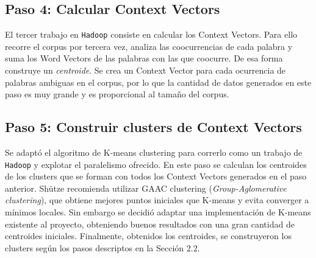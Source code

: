 \documentclass[11pt]{article}
\begin{document}
\subsection{Paso 4: Calcular Context Vectors}
El tercer trabajo en \texttt{Hadoop} consiste en calcular los Context Vectors. Para ello recorre el corpus por tercera vez, analiza las coocurrencias de cada palabra y suma los Word Vectors de las palabras con las que coocurre. De esa forma construye un \emph{centroide}.
Se crea un Context Vector para cada ocurrencia de palabras ambiguas en el corpus, por lo que la cantidad de datos generados en este paso es muy grande y es proporcional al tamaño del corpus. 
\subsection{Paso 5: Construir clusters de Context Vectors}
Se adaptó el algoritmo de K-means clustering para correrlo como un trabajo de \texttt{Hadoop} y explotar el paralelismo ofrecido.
En este paso se calculan los centroides de los clusters que se forman con todos los Context Vectors generados en el paso anterior.
Shütze recomienda utilizar GAAC clustering (\emph{Group-Aglomerative clustering}), que obtiene mejores puntos iniciales que K-means y evita converger a mínimos locales.
Sin embargo se decidió adaptar una implementación de K-means existente al proyecto, obteniendo buenos resultados con una gran cantidad de centroides iniciales.
Finalmente, obtenidos los centroides, se construyeron los clusters según los pasos descriptos en la Sección 2.2.
\end{document}
